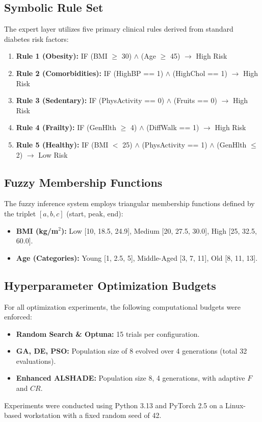 \documentclass[conference]{IEEEtran}
\begin{document}
\subsection{Symbolic Rule Set}
 The expert layer utilizes five primary clinical rules derived from standard diabetes risk factors:
\begin{enumerate}
    \item \textbf{Rule 1 (Obesity):} IF (BMI $\ge$ 30) $\land$ (Age $\ge$ 45) $\rightarrow$ High Risk
    \item \textbf{Rule 2 (Comorbidities):} IF (HighBP == 1) $\land$ (HighChol == 1) $\rightarrow$ High Risk
    \item \textbf{Rule 3 (Sedentary):} IF (PhysActivity == 0) $\land$ (Fruits == 0) $\rightarrow$ High Risk
    \item \textbf{Rule 4 (Frailty):} IF (GenHlth $\ge$ 4) $\land$ (DiffWalk == 1) $\rightarrow$ High Risk
    \item \textbf{Rule 5 (Healthy):} IF (BMI $<$ 25) $\land$ (PhysActivity == 1) $\land$ (GenHlth $\le$ 2) $\rightarrow$ Low Risk
\end{enumerate}

\subsection{Fuzzy Membership Functions}
 The fuzzy inference system employs triangular membership functions defined by the triplet $[a, b, c]$ (start, peak, end):
\begin{itemize}
    \item \textbf{BMI (kg/m$^2$):} Low [10, 18.5, 24.9], Medium [20, 27.5, 30.0], High [25, 32.5, 60.0].
    \item \textbf{Age (Categories):} Young [1, 2.5, 5], Middle-Aged [3, 7, 11], Old [8, 11, 13].
\end{itemize}

\subsection{Hyperparameter Optimization Budgets}
 For all optimization experiments, the following computational budgets were enforced:
\begin{itemize}
    \item \textbf{Random Search \& Optuna:} 15 trials per configuration.
    \item \textbf{GA, DE, PSO:} Population size of 8 evolved over 4 generations (total 32 evaluations).
    \item \textbf{Enhanced ALSHADE:} Population size 8, 4 generations, with adaptive $F$ and $CR$.
\end{itemize}
Experiments were conducted using Python 3.13 and PyTorch 2.5 on a Linux-based workstation with a fixed random seed of 42.
\end{document}
